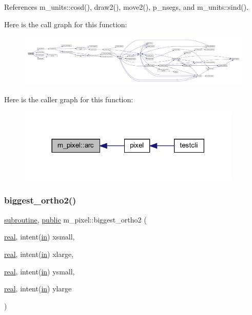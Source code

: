 References m\+\_\+units\+::cosd(), draw2(), move2(), p\+\_\+nsegs, and m\+\_\+units\+::sind().

Here is the call graph for this function\+:
\nopagebreak
\begin{figure}[H]
\begin{center}
\leavevmode
\includegraphics[width=350pt]{namespacem__pixel_ab881b9c2adff081a086cd83a1f1341fb_cgraph}
\end{center}
\end{figure}
Here is the caller graph for this function\+:
\nopagebreak
\begin{figure}[H]
\begin{center}
\leavevmode
\includegraphics[width=302pt]{namespacem__pixel_ab881b9c2adff081a086cd83a1f1341fb_icgraph}
\end{center}
\end{figure}
\mbox{\label{namespacem__pixel_accc2eab6fbc7b453afa34e1e2c834223}} 
\subsubsection{\texorpdfstring{biggest\+\_\+ortho2()}{biggest\_ortho2()}}
{\footnotesize\ttfamily \hyperlink{M__stopwatch_83_8txt_acfbcff50169d691ff02d4a123ed70482}{subroutine}, \hyperlink{M__stopwatch_83_8txt_a2f74811300c361e53b430611a7d1769f}{public} m\+\_\+pixel\+::biggest\+\_\+ortho2 (\begin{DoxyParamCaption}\item[{\hyperlink{read__watch_83_8txt_abdb62bde002f38ef75f810d3a905a823}{real}, intent(\hyperlink{M__journal_83_8txt_afce72651d1eed785a2132bee863b2f38}{in})}]{xsmall,  }\item[{\hyperlink{read__watch_83_8txt_abdb62bde002f38ef75f810d3a905a823}{real}, intent(\hyperlink{M__journal_83_8txt_afce72651d1eed785a2132bee863b2f38}{in})}]{xlarge,  }\item[{\hyperlink{read__watch_83_8txt_abdb62bde002f38ef75f810d3a905a823}{real}, intent(\hyperlink{M__journal_83_8txt_afce72651d1eed785a2132bee863b2f38}{in})}]{ysmall,  }\item[{\hyperlink{read__watch_83_8txt_abdb62bde002f38ef75f810d3a905a823}{real}, intent(\hyperlink{M__journal_83_8txt_afce72651d1eed785a2132bee863b2f38}{in})}]{ylarge }\end{DoxyParamCaption})}



